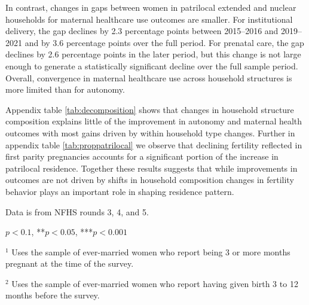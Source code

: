 \documentclass[12pt]{article}
\begin{document}
In contrast, changes in gaps between women in patrilocal extended and nuclear households for maternal healthcare use outcomes are smaller. For institutional delivery, the gap declines by 2.3 percentage points between 2015–2016 and 2019–2021 and by 3.6 percentage points over the full period. For prenatal care, the gap declines by 2.6 percentage points in the later period, but this change is not large enough to generate a statistically significant decline over the full sample period. Overall, convergence in maternal healthcare use across household structures is more limited than for autonomy. 

Appendix table \ref{tab:decomposition} shows that changes in household structure  composition explains little of the improvement in autonomy and maternal health outcomes with most gains driven by within household type changes. Further in appendix table \ref{tab:proppatrilocal} we observe that declining fertility reflected in first parity pregnancies accounts for a significant portion of the increase in patrilocal residence. Together these results suggests that while improvements in outcomes are not driven by shifts in household composition changes in fertility behavior plays an important role in shaping residence pattern.

\begin{table}[!htbp]
    \centering
    \begin{threeparttable}[t]
        \caption{: The gap between patrilocal extended and nuclear households in women's autonomy and health care use in narrowing across survey rounds}
        \label{tab:narrowinggaps}

        \scriptsize
        \setlength{\tabcolsep}{6pt}
        \renewcommand{\arraystretch}{1.6}

        

        \begin{tablenotes}
            \item Data is from NFHS rounds 3, 4, and 5.
            \item *$p<0.1$, **$p<0.05$, ***$p<0.001$
            \item $^1$ Uses the sample of ever-married women who report being 3 or more months pregnant at the time of the survey.
            \item $^2$ Uses the sample of ever-married women who report having given birth 3 to 12 months before the survey.
        \end{tablenotes}
    \end{threeparttable}
\end{table}
\end{document}
